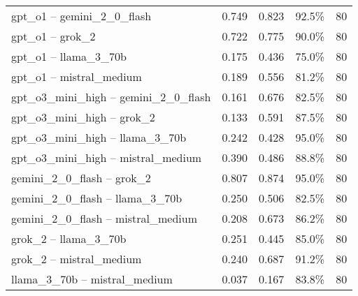 \documentclass{article}
\begin{document}
\begin{table}[htbp]
\begin{tabular}{lcccc}
gpt\_o1 -- gemini\_2\_0\_flash & 0.749 & 0.823 & 92.5\% & 80 \\
gpt\_o1 -- grok\_2 & 0.722 & 0.775 & 90.0\% & 80 \\
gpt\_o1 -- llama\_3\_70b & 0.175 & 0.436 & 75.0\% & 80 \\
gpt\_o1 -- mistral\_medium & 0.189 & 0.556 & 81.2\% & 80 \\
gpt\_o3\_mini\_high -- gemini\_2\_0\_flash & 0.161 & 0.676 & 82.5\% & 80 \\
gpt\_o3\_mini\_high -- grok\_2 & 0.133 & 0.591 & 87.5\% & 80 \\
gpt\_o3\_mini\_high -- llama\_3\_70b & 0.242 & 0.428 & 95.0\% & 80 \\
gpt\_o3\_mini\_high -- mistral\_medium & 0.390 & 0.486 & 88.8\% & 80 \\
gemini\_2\_0\_flash -- grok\_2 & 0.807 & 0.874 & 95.0\% & 80 \\
gemini\_2\_0\_flash -- llama\_3\_70b & 0.250 & 0.506 & 82.5\% & 80 \\
gemini\_2\_0\_flash -- mistral\_medium & 0.208 & 0.673 & 86.2\% & 80 \\
grok\_2 -- llama\_3\_70b & 0.251 & 0.445 & 85.0\% & 80 \\
grok\_2 -- mistral\_medium & 0.240 & 0.687 & 91.2\% & 80 \\
llama\_3\_70b -- mistral\_medium & 0.037 & 0.167 & 83.8\% & 80 \\
\bottomrule
\end{tabular}
\end{table}
\end{document}
